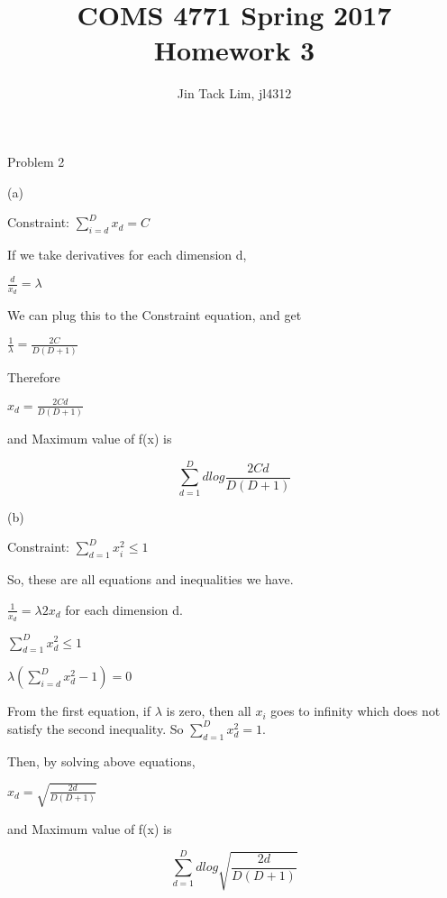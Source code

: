 \documentclass[11pt]{article}
\title{COMS 4771 Spring 2017 Homework 3}
\author{Jin Tack Lim, jl4312
  }
\date{%
  }
\theoremstyle{definition}
\begin{document}
\maketitle



\newcommand{\gau}[3]{
$\frac{1}{{ \sqrt {2\pi #3 ^2} }}e^{ \frac { - \left( {#1 - #2 } \right)^2 } {2#3 ^2}}$
}

\newcommand{\gauraw}[3]{
\frac{1}{{ \sqrt {2\pi #3 ^2} }}e^{ \frac { - \left( {#1 - #2 } \right)^2 } {2#3 ^2}}
}


Problem 2

(a)

Constraint: $\sum_{i=d}^{D} x_d = C$

If we take derivatives for each dimension d,

$\frac{d}{x_d} = \lambda$

We can plug this to the Constraint equation, and get

$\frac{1}{\lambda} = \frac {2C}{D(D+1)}$

Therefore

$ x_d = \frac{2Cd}{D(D+1)}$

and Maximum value of f(x) is

$$\boxed{\sum_{d=1}^{D}d log \frac{2Cd}{D(D+1)}}$$


(b)

Constraint: $\sum_{d=1}^{D} x_i^2 \leq 1$

So, these are all equations and inequalities we have.

$ \frac {1}{x_d} = \lambda 2x_d $ for each dimension d.

$\sum_{d=1}^{D} x_d^2 \leq 1$

$\lambda (\sum_{i=d}^{D} x_d^2 -1 ) = 0 $

From the first equation, if $\lambda$ is zero, then all $x_i$ goes to infinity which does not satisfy the second inequality. So $\sum_{d=1}^{D} x_d^2 =1$.

Then, by solving above equations,

$x_d = \sqrt{\frac{2d}{D(D+1)}}$

and Maximum value of f(x) is

$$\boxed{\sum_{d=1}^{D}d log \sqrt{\frac{2d}{D(D+1)}}}$$
\end{document}
